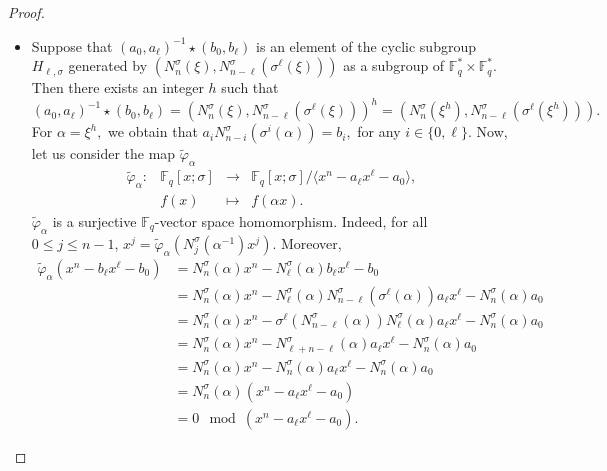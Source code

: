 \documentclass[12pt,paper]{article}
\theoremstyle{plain}
\newcommand{\Fq}{\mathbb{F}_{q}}
\begin{document}
\begin{proof}
\begin{itemize}
    \item[(4) $\Rightarrow$ (1):] 
     Suppose that $ (a_0,a_{\ell})^{-1}\star (b_0, b_{\ell}) $ is an element of the cyclic subgroup  $H_{\ell,\sigma}$ generated by 
     $  (N_{n}^{\sigma}(\xi), N_{n-\ell}^{\sigma}(\sigma^{\ell}(\xi)))  $  as a subgroup of $ \Fq^{*}\times \Fq^{*}.$ Then there exists an integer $ h$ such that 
     $$ (a_0,a_{\ell})^{-1}\star (b_0, b_{\ell})= \left(N_{n}^{\sigma}(\xi), N_{n-\ell}^{\sigma}(\sigma^{\ell}(\xi))\right)^h = \left( N_{n}^{\sigma}(\xi^h), N_{n-\ell}^{\sigma}(\sigma^{\ell}(\xi^h))\right).$$
    For $ \alpha=  \xi^{h}, $ we obtain  that $  a_i N_{n-i}^{\sigma}( \sigma^{i}(\alpha))= b_i, $ for any $ i\in \{ 0,\ell\}.$
Now, let us consider the map $ \tilde{\varphi}_{\alpha}$  
  \begin{equation}
        \begin{array}{cccc}
        \tilde{\varphi}_{\alpha} : & \mathbb{F}_q[x;\sigma]   & \longrightarrow & \mathbb{F}_q[x;\sigma] /\langle x^n - a_{\ell} x^{\ell} - a_0 \rangle, \\ 
        & f(x) & \longmapsto & f(\alpha x).
        \end{array}
    \end{equation} 
	$ \tilde{\varphi}_{\alpha}$ is a surjective $\Fq$-vector space homomorphism. Indeed, for  all $0\leq j \leq n-1$, $x^{j} = \tilde{\varphi}_{\alpha}(N_{j}^{\sigma}(\alpha^{-1}) x^{j}).$ 
	Moreover, 
 $$ 
    \begin{array}{rl}
    \tilde{\varphi}_{\alpha} (x^n - b_{\ell} x^{\ell} - b_0) & = N^{\sigma}_n(\alpha) x^n - N^{\sigma}_{\ell}(\alpha) b_{\ell} x^{\ell} - b_0 \\
    & = N^{\sigma}_n(\alpha) x^n - N^{\sigma}_{\ell}(\alpha)  N_{n-\ell}^{\sigma}( \sigma^{\ell}(\alpha)) a_{\ell} x^{\ell} - N^{\sigma}_n(\alpha) a_0 \\
    & = N^{\sigma}_n(\alpha) x^n -  \sigma^{\ell}(N_{n-\ell}^{\sigma}( \alpha))  N^{\sigma}_{\ell}(\alpha)  a_{\ell} x^{\ell} - N^{\sigma}_n(\alpha) a_0 \\
    & = N^{\sigma}_n(\alpha) x^n - N_{\ell+ n-\ell}^{\sigma}( \alpha)  a_{\ell} x^{\ell} - N^{\sigma}_n(\alpha) a_0 \\
     & = N^{\sigma}_n(\alpha) x^n - N^{\sigma}_n(\alpha)  a_{\ell} x^{\ell} - N^{\sigma}_n(\alpha) a_0 \\
    & = N^{\sigma}_n(\alpha) (x^n - a_{\ell} x^{\ell} - a_0) \\
    & = 0 \mod (x^n - a_{\ell} x^{\ell} - a_0).
    \end{array}
$$
\end{itemize}
\end{proof}
\end{document}
